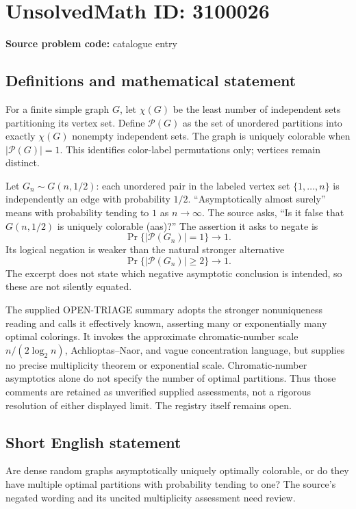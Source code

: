 \documentclass[11pt]{article}
\begin{document}
\section*{UnsolvedMath ID: 3100026}
\textbf{Source problem code:} catalogue entry
\subsection{Definitions and mathematical statement}
For a finite simple graph \(G\), let \(\chi(G)\) be the least number of independent sets partitioning its vertex set. Define \(\mathcal P(G)\) as the set of unordered partitions into exactly \(\chi(G)\) nonempty independent sets. The graph is uniquely colorable when \(|\mathcal P(G)|=1\). This identifies color-label permutations only; vertices remain distinct.

Let \(G_n\sim G(n,1/2)\): each unordered pair in the labeled vertex set \(\{1,\ldots,n\}\) is independently an edge with probability \(1/2\). ``Asymptotically almost surely'' means with probability tending to \(1\) as \(n\to\infty\). The source asks, ``Is it false that \(G(n,1/2)\) is uniquely colorable (aas)?'' The assertion it asks to negate is
\[
\Pr\{|\mathcal P(G_n)|=1\}\longrightarrow1.
\]
Its logical negation is weaker than the natural stronger alternative
\[
\Pr\{|\mathcal P(G_n)|\ge2\}\longrightarrow1.
\]
The excerpt does not state which negative asymptotic conclusion is intended, so these are not silently equated.

The supplied OPEN-TRIAGE summary adopts the stronger nonuniqueness reading and calls it effectively known, asserting many or exponentially many optimal colorings. It invokes the approximate chromatic-number scale \(n/(2\log_2n)\), Achlioptas--Naor, and vague concentration language, but supplies no precise multiplicity theorem or exponential scale. Chromatic-number asymptotics alone do not specify the number of optimal partitions. Thus those comments are retained as unverified supplied assessments, not a rigorous resolution of either displayed limit. The registry itself remains open.
\subsection{Short English statement}
Are dense random graphs asymptotically uniquely optimally colorable, or do they have multiple optimal partitions with probability tending to one? The source's negated wording and its uncited multiplicity assessment need review.
\end{document}
